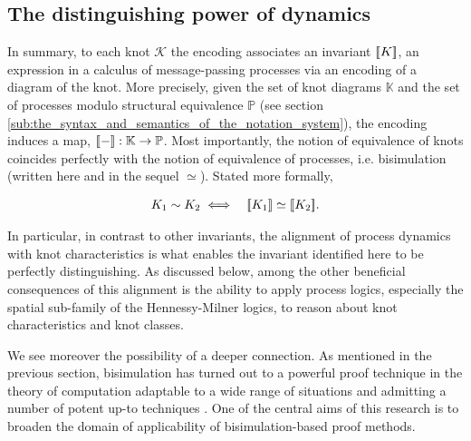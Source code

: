 \subsection{The distinguishing power of dynamics}\label{sub:dynamic distinction} %

In summary, to each knot $\mathcal{K}$ the encoding associates an
invariant $[\![ K ]\!]$, an expression in a calculus of
message-passing processes via an encoding of a diagram of the
knot. More precisely, given the set of knot diagrams $\mathbb{K}$ and
the set of processes modulo structural equivalence $\mathbb {P}$ (see section
\ref{sub:the_syntax_and_semantics_of_the_notation_system}), the encoding induces a map, $[\![ - ]\!]: \mathbb{K} \to \mathbb
{P}$. Most importantly, the notion of equivalence of knots coincides perfectly with the notion of equivalence of
processes, i.e. bisimulation (written here and in the sequel
$\simeq$). Stated more formally,

\begin{theorem}[main]
\begin{eqnarray*}
    K_1 \sim K_2 & \iff & [\![ K_1 ]\!] \simeq [\![ K_2 ]\!]. \nonumber
\end{eqnarray*}
\end{theorem}

In particular, in contrast to other invariants, the alignment of process
dynamics with knot characteristics is what enables the invariant
identified here to be perfectly distinguishing. As discussed below,
among the other beneficial consequences of this alignment is the
ability to apply process logics, especially the spatial sub-family of
the Hennessy-Milner logics, to reason about knot characteristics and
knot classes.

We see moreover the possibility of a deeper connection. As mentioned
in the previous section, bisimulation has turned out to a powerful
proof technique in the theory of computation adaptable to a wide range
of situations and admitting a number of potent up-to techniques
\cite{DBLP:conf/lics/Sangiorgi04}. One of the central aims of this
research is to broaden the domain of applicability of
bisimulation-based proof methods.

